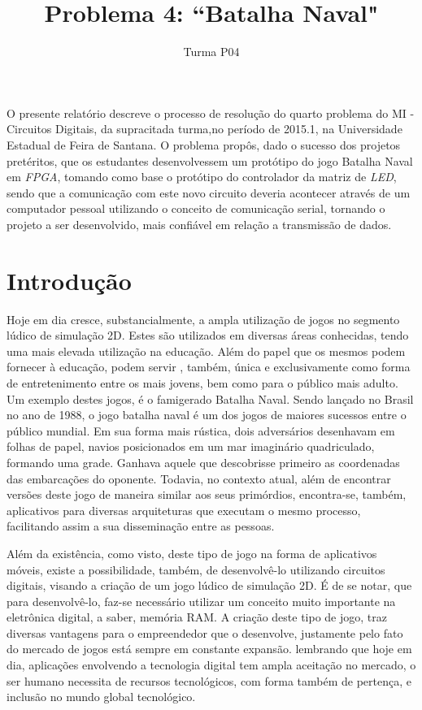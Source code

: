 \documentclass[12pt]{article}
\title{Problema 4: ``Batalha Naval"}
\author{Turma P04}
\begin{document}
 

\maketitle

\begin{resumo} 
O presente relatório descreve o processo de resolução do quarto problema do MI - Circuitos Digitais, da supracitada turma,no período de 2015.1, na Universidade Estadual de Feira de Santana. O problema propôs, dado o sucesso dos projetos pretéritos, que os estudantes desenvolvessem um protótipo do jogo Batalha Naval em \textit{FPGA}, tomando como base o  protótipo do controlador da matriz de \textit{LED}, sendo que a comunicação com este novo circuito deveria acontecer através de um computador pessoal utilizando o conceito de comunicação serial, tornando o projeto a ser desenvolvido, mais confiável em relação a transmissão de dados.
\end{resumo}

\section{Introdução}

Hoje em dia cresce, substancialmente, a ampla utilização de jogos no segmento lúdico de simulação 2D. Estes são utilizados em diversas áreas conhecidas, tendo uma mais elevada utilização na educação. Além do papel que os mesmos podem fornecer à educação, podem servir , também, única e exclusivamente como forma de entretenimento entre os mais jovens, bem como para o público mais adulto. Um exemplo destes jogos, é o famigerado Batalha Naval. Sendo lançado no Brasil no ano de 1988, o jogo batalha naval é um dos jogos de maiores sucessos entre o público mundial. Em sua forma mais rústica, dois adversários desenhavam em folhas de papel, navios posicionados em um mar imaginário quadriculado, formando uma grade. Ganhava aquele que descobrisse primeiro as coordenadas das embarcações do oponente. Todavia, no contexto atual, além de encontrar versões deste jogo de maneira similar aos seus primórdios, encontra-se, também, aplicativos para diversas arquiteturas que executam o mesmo processo, facilitando assim a sua disseminação entre as pessoas.

Além da existência, como visto, deste tipo de jogo na forma de aplicativos móveis, existe a possibilidade, também, de desenvolvê-lo utilizando circuitos digitais, visando a criação de um jogo lúdico de simulação 2D.  É de se notar, que para desenvolvê-lo, faz-se necessário utilizar um conceito muito importante na eletrônica digital, a saber, memória RAM. A criação deste tipo de jogo, traz diversas vantagens para o empreendedor que o desenvolve, justamente pelo fato do mercado de jogos está sempre em constante expansão. lembrando que hoje em dia, aplicações envolvendo a tecnologia digital tem ampla aceitação no mercado, o ser humano necessita de recursos tecnológicos, com forma também de pertença, e inclusão no mundo global tecnológico. 
\end{document}

